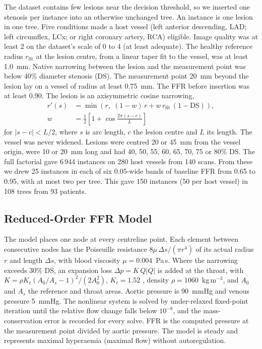 \documentclass[journal]{IEEEtran}
\begin{document}
The dataset contains few lesions near the decision threshold, so we inserted one stenosis per instance into an
otherwise unchanged tree. An instance is one lesion in one tree. Five conditions made a host vessel (left anterior
descending, LAD; left circumflex, LCx; or right coronary artery, RCA) eligible. Image quality was at least 2 on the
dataset's scale of 0 to 4 (at least adequate). The healthy reference radius $r_\mathrm{fit}$ at the lesion centre, from a linear taper
fit to the vessel, was at least 1.0~mm. Native narrowing between the lesion and the measurement point was below
40\% diameter stenosis (DS). The measurement point 20~mm beyond the lesion lay on a vessel of radius at least
0.75~mm. The FFR before insertion was at least 0.90. The lesion is an axisymmetric cosine narrowing,
\begin{equation}
\begin{aligned}
r'(s) &= \min\!\left(r,\; (1-w)\,r + w\,r_\mathrm{fit}\,(1-\mathrm{DS})\right),\\
w &= \tfrac{1}{2}\left[1+\cos\tfrac{2\pi (s-c)}{L}\right]
\end{aligned}
\end{equation}
for $|s-c|<L/2$, where $s$ is arc length, $c$ the lesion centre and $L$ its length. The vessel was never widened.
Lesions were centred 20 or 45~mm from the vessel origin, were 10 or 20~mm long and had 40, 50, 55, 60, 65, 70, 75
or 80\% DS. The full factorial gave 6\,944 instances on 280 host vessels from 140 scans. From these we drew 25
instances in each of six 0.05-wide bands of baseline FFR from 0.65 to 0.95, with at most two per tree. This gave
150 instances (50 per host vessel) in 108 trees from 93 patients.

\subsection{Reduced-Order FFR Model}
The model places one node at every centreline point. Each element between consecutive nodes has the Poiseuille
resistance $8\mu\,\Delta s/(\pi r^4)$ of its actual radius $r$ and length $\Delta s$, with blood viscosity
$\mu = 0.004$~Pa\,s. Where the narrowing exceeds 30\% DS, an expansion loss $\Delta p = K\,Q|Q|$ is added at the
throat, with $K = \rho K_t (A_0/A_s - 1)^2 / (2A_0^2)$, $K_t = 1.52$ \cite{young1973}, density
$\rho = 1060$~kg\,m$^{-3}$, and $A_0$ and $A_s$ the reference and throat areas. Aortic pressure is 90~mmHg and
venous pressure 5~mmHg. The nonlinear system is solved by under-relaxed fixed-point iteration until the relative
flow change falls below $10^{-8}$, and the mass-conservation error is recorded for every solve. FFR is the computed
pressure at the measurement point divided by aortic pressure. The model is steady and represents maximal hyperaemia
(maximal flow) without autoregulation.
\end{document}
